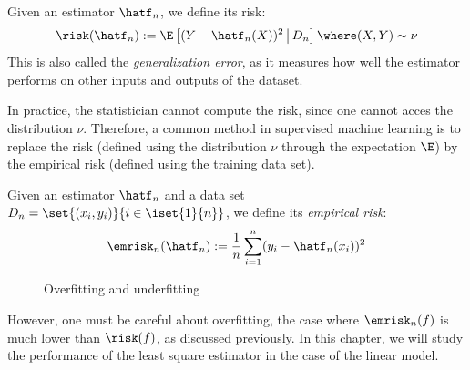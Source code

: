 \documentclass[toc, titlepaged]{../cs-classes/cs-classes}
\begin{document}
\begin{definition}
    Given an estimator $\hatf_n$, we define its risk:
    \begin{equation}
        \label{eq:sq-risk}
        \risk(\hatf_n) := \E\left[(Y-\hatf_n(X))^2\,\big| \, D_n\right] \where (X, Y)\sim\nu
    \end{equation}
    This is also called the \emph{generalization error}, as it measures how well the estimator performs on other inputs and outputs of the dataset.
\end{definition}

In practice, the statistician cannot compute the risk, since one cannot acces the distribution $\nu$. Therefore, a common method in supervised machine learning is to replace the risk (defined using the distribution $\nu$ through the expectation $\E$) by the empirical risk (defined using the training data set).

\begin{definition}
    Given an estimator $\hatf_n$ and a data set $D_n=\set{(x_i, y_i)}{i\in\iset{1}{n}}$, we define its \emph{empirical risk}:
    \begin{equation}
        \label{eq:sq-empirical-risk}
        \emrisk_n(\hatf_n) := \frac{1}{n}\sum_{i=1}^n (y_i-\hatf_n(x_i))^2
    \end{equation}
\end{definition}

\begin{figure}
    \centering
    \captionsetup{justification=centering}
    \caption{Overfitting and underfitting}
\end{figure}
However, one must be careful about overfitting, the case where $\emrisk_n(f)$ is much lower than $\risk(f)$, as discussed previously. In this chapter, we will study the performance of the least square estimator in the case of the linear model.
\end{document}
